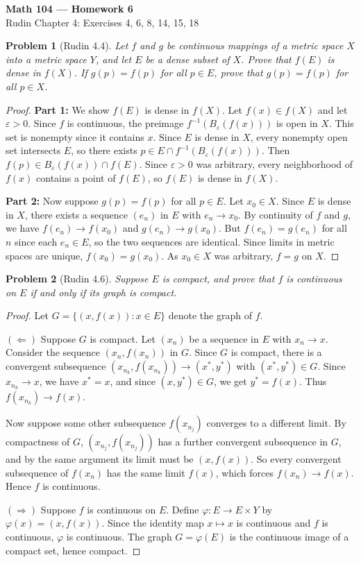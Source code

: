\documentclass[12 pt]{article}        	%
\newtheorem{prob}{Problem}
\newcommand{\eps}{\varepsilon}
\begin{document}
\begin{center}
    \textbf{\Large Math 104 --- Homework 6}\\[0.5em]
    \large Rudin Chapter 4: Exercises 4, 6, 8, 14, 15, 18
\end{center}

\begin{prob}[Rudin 4.4]
Let $f$ and $g$ be continuous mappings of a metric space $X$ into a metric space $Y$, and let $E$ be a dense subset of $X$. Prove that $f(E)$ is dense in $f(X)$. If $g(p) = f(p)$ for all $p \in E$, prove that $g(p) = f(p)$ for all $p \in X$.
\end{prob}
\begin{proof}
\textbf{Part 1:} We show $f(E)$ is dense in $f(X)$. Let $f(x) \in f(X)$ and let $\eps > 0$. Since $f$ is continuous, the preimage $f^{-1}(B_\eps(f(x)))$ is open in $X$. This set is nonempty since it contains $x$. Since $E$ is dense in $X$, every nonempty open set intersects $E$, so there exists $p \in E \cap f^{-1}(B_\eps(f(x)))$. Then $f(p) \in B_\eps(f(x)) \cap f(E)$. Since $\eps > 0$ was arbitrary, every neighborhood of $f(x)$ contains a point of $f(E)$, so $f(E)$ is dense in $f(X)$.

\textbf{Part 2:} Now suppose $g(p) = f(p)$ for all $p \in E$. Let $x_0 \in X$. Since $E$ is dense in $X$, there exists a sequence $(e_n)$ in $E$ with $e_n \to x_0$. By continuity of $f$ and $g$, we have $f(e_n) \to f(x_0)$ and $g(e_n) \to g(x_0)$. But $f(e_n) = g(e_n)$ for all $n$ since each $e_n \in E$, so the two sequences are identical. Since limits in metric spaces are unique, $f(x_0) = g(x_0)$. As $x_0 \in X$ was arbitrary, $f = g$ on $X$.
\end{proof}

\begin{prob}[Rudin 4.6]
Suppose $E$ is compact, and prove that $f$ is continuous on $E$ if and only if its graph is compact.
\end{prob}
\begin{proof}
Let $G = \{(x, f(x)) : x \in E\}$ denote the graph of $f$.

$(\Leftarrow)$ Suppose $G$ is compact. Let $(x_n)$ be a sequence in $E$ with $x_n \to x$. Consider the sequence $(x_n, f(x_n))$ in $G$. Since $G$ is compact, there is a convergent subsequence $(x_{n_k}, f(x_{n_k})) \to (x^*, y^*)$ with $(x^*, y^*) \in G$. Since $x_{n_k} \to x$, we have $x^* = x$, and since $(x, y^*) \in G$, we get $y^* = f(x)$. Thus $f(x_{n_k}) \to f(x)$.

Now suppose some other subsequence $f(x_{n_j})$ converges to a different limit. By compactness of $G$, $(x_{n_j}, f(x_{n_j}))$ has a further convergent subsequence in $G$, and by the same argument its limit must be $(x, f(x))$. So every convergent subsequence of $f(x_n)$ has the same limit $f(x)$, which forces $f(x_n) \to f(x)$. Hence $f$ is continuous.

$(\Rightarrow)$ Suppose $f$ is continuous on $E$. Define $\varphi: E \to E \times Y$ by $\varphi(x) = (x, f(x))$. Since the identity map $x \mapsto x$ is continuous and $f$ is continuous, $\varphi$ is continuous. The graph $G = \varphi(E)$ is the continuous image of a compact set, hence compact.
\end{proof}
\end{document}
